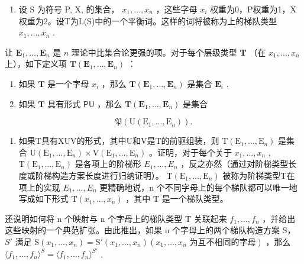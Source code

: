 \exercisegroup

\begin{enumerate}
\def\labelenumi{\arabic{enumi}.}
\tightlist
\item
  设 S 为符号 P, X, 的集合， \(x_{1}, \ldots, x_{n}\) ，这些字母 \(x_{i}\) 权重为0，P权重为1，X权重为2。设T为L(S)中的一个平衡词。这样的词将被称为上的梯队类型 \(x_{1}, \ldots, x_{n}\) .
\end{enumerate}

让 \(\mathbf{E}_1, \ldots, \mathbf{E}_n\) 是 \(n\) 理论中比集合论更强的项。对于每个层级类型 \(\mathbf{T}\) （在 \(x_1, \ldots, x_n\) 上），如下定义项 \(\mathbf{T}(\mathbf{E}_1, \ldots, \mathbf{E}_n)\) ：

\begin{enumerate}
\def\labelenumi{(\roman{enumi})}
\item
  如果 \(\mathbf{T}\) 是一个字母 \(x_{i}\) ，那么 \(\mathbf{T}(\mathbf{E}_{1},\ldots,\mathbf{E}_{n})\) 是集合 \(\mathbf{E}_i\) .
\item
  如果 \(\mathbf{T}\) 具有形式 \(\mathsf{PU}\) ，那么 \(\mathbf{T}(\mathbf{E}_1, \ldots, \mathbf{E}_n)\) 是集合
\end{enumerate}

\[
\mathfrak {P} (\mathrm{U} (\mathrm{E} _ {1}, \dots , \mathrm{E} _ {n})).
\]

\begin{enumerate}
\def\labelenumi{(\roman{enumi})}
\setcounter{enumi}{2}
\tightlist
\item
  如果T具有XUV的形式，其中U和V是T的前驱组装，则 \(\mathrm{T}(\mathrm{E}_{1},\ldots,\mathrm{E}_{n})\) 是集合 \(\mathrm{U}(\mathrm{E}_{1},\ldots,\mathrm{E}_{n})\times\mathrm{V}(\mathrm{E}_{1},\ldots,\mathrm{E}_{n})\) 。证明，对于每个关于 \(x_{1},\ldots,x_{n}\) , \(\mathrm{T}(\mathrm{E}_{1},\ldots,\mathrm{E}_{n})\) 是各项上的阶梯形 \(E_{1},\ldots,E_{n}\) ，反之亦然（通过对阶梯类型长度或阶梯构造方案长度进行归纳证明）。 \(\mathrm{T}(\mathrm{E}_{1},\ldots,\mathrm{E}_{n})\) 被称为阶梯类型T在项上的实现 \(E_{1},\ldots,E_{n}\) 更精确地说，n 个不同字母上的每个梯队都可以唯一地写成如下形式 \(\mathrm{T}(x_{1},\ldots,x_{n})\) ，其中 T 是一个梯队类型。
\end{enumerate}

还说明如何将 n 个映射与 n 个字母上的梯队类型 T 关联起来 \(f_{1}, \ldots, f_{n}\) ，并给出这些映射的一个典范扩张。由此推出，如果 n 个字母上的两个梯队构造方案 S， \(S'\) 满足 \(\mathrm{S}(x_{1}, \ldots, x_{n}) = \mathrm{S}'(x_{1}, \ldots, x_{n}) (x_{1}, \ldots, x_{n} \text{ 为互不相同的字母})\) ，那么 \(\langle f_{1}, \ldots, f_{n} \rangle^{S} = \langle f_{1}, \ldots, f_{n} \rangle^{S'}\) .

